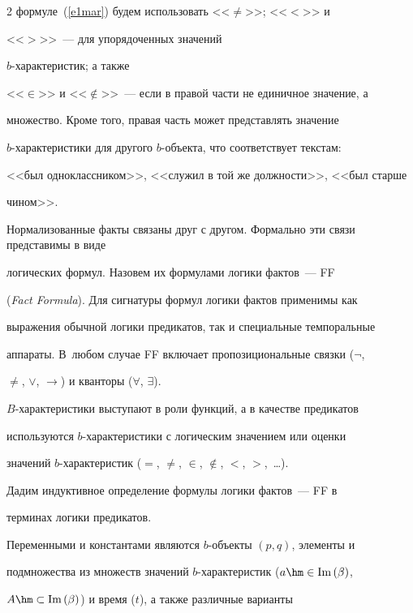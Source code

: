 \begin{multicols}{2}
формуле~(\ref{e1mar}) будем использовать <<$\not=$>>; <<$<$>> и 


  <<$>$>>~--- для упорядоченных значений\linebreak


   $b$-ха\-рак\-те\-ри\-стик; а также 


<<$\in$>> и <<$\not\in$>>~--- если в правой части не единичное значение, а 


множество. Кроме того, правая часть может представлять значение 


  $b$-характеристики для другого $b$-объекта, что соответствует текстам: 


<<был одноклассником>>, <<служил в той же должности>>, <<был старше 


чином>>.


  


  Нормализованные факты связаны друг с другом. Формально эти связи представимы в виде 


логических формул. Назовем их формулами логики фактов~--- FF 


(\textit{Fact Formula}). Для сигнатуры формул логики фактов применимы как 


выражения обычной логики предикатов, так и специальные темпоральные 


аппараты. В~любом случае FF включает пропозициональные связки ($\lnot$, 


$\neq$, $\vee$, $\rightarrow$) и кванторы ($\forall$, $\exists$). 


  $B$-характеристики выступают в роли функций, а в качестве предикатов 


используются $b$-характеристики с логическим значением или оценки 


значений $b$-характеристик ($=$, $\not=$, $\in$, $\not\in$, $<$, $>$,\ \ldots).


  


  Дадим индуктивное определение формулы логики фактов~--- FF в 


терминах логики предикатов.


  


  Переменными и константами являются $b$-объ\-ек\-ты $(p, q)$, элементы и 


подмножества из множеств значений $b$-характеристик ($a\hm\in \mathrm{Im}\left(\beta\right)$, 


$A\hm\subset \mathrm{Im}\left(\beta\right)$) и время ($t$), а также различные варианты 



\end{multicols}
